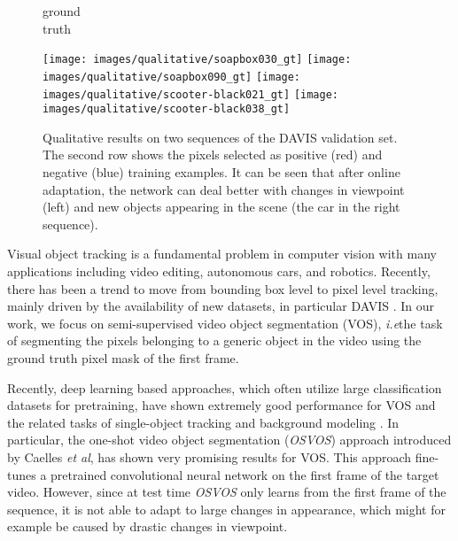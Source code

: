 \documentclass{bmvc2k}
\newcommand{\methodname}[1]{\mbox{\emph{#1}}}
\def\etal{\emph{et al}\bmvaOneDot}
\def\ie{\emph{i.e}\bmvaOneDot}
\begin{document}
\begin{figure}[t]
\begin{center}
\begin{minipage}{0.12\textwidth}
\begin{center}
\vfill
\small
ground\\
truth
\vfill
\end{center}
\end{minipage}
\begin{minipage}{0.87\textwidth}
\texttt{[image: images/qualitative/soapbox030\_gt]}
\texttt{[image: images/qualitative/soapbox090\_gt]}
\hspace{0.1cm}
\texttt{[image: images/qualitative/scooter-black021\_gt]}
\texttt{[image: images/qualitative/scooter-black038\_gt]}
\end{minipage}

\end{center}

\caption{\label{fig:teaser}Qualitative results on two sequences of the DAVIS validation set. The second row shows the pixels selected as positive (red) and negative (blue) training examples. It can be seen that after online adaptation, the network can deal better with changes in viewpoint (left) and new objects appearing in the scene (the car in the right sequence).}
\end{figure}

Visual object tracking is a fundamental problem in computer vision with many applications including video editing, autonomous cars, and robotics. Recently, there has been a trend to move from bounding box level to pixel level tracking, mainly driven by the availability of new datasets, in particular DAVIS \cite{DAVIS2016}. In our work, we focus on semi-supervised video object segmentation (VOS), \ie the task of segmenting the pixels belonging to a generic object in the video using the ground truth pixel mask of the first frame.

Recently, deep learning based approaches, which often utilize large classification datasets for pretraining, have shown extremely good performance for VOS \cite{OSVOS, masktrack, lucidtracker, fusionseg} and the related tasks of single-object tracking \cite{mdnet, GOTURN, Bertinetto2016ECCV} and background modeling \cite{Babaee17arxiv, Braham16IWSSIP, Wang16PRL}. 
In particular, the one-shot video object segmentation (\methodname{OSVOS}) approach introduced by Caelles \etal \cite{OSVOS}, has shown very promising results for VOS. This approach fine-tunes a pretrained convolutional neural network on the first frame of the target video. However, since at test time \methodname{OSVOS} only learns from the first frame of the sequence, it is not able to adapt to large changes in appearance, which might for example be caused by drastic changes in viewpoint.
\end{document}
